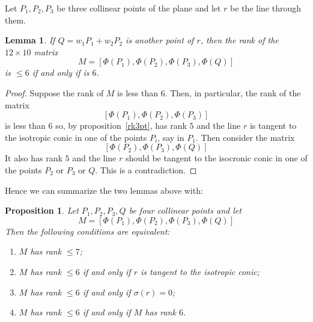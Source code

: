 \documentclass{amsart}
\theoremstyle{plain}
\newtheorem{prop}[theorem]{Proposition}
\newtheorem{lemma}[theorem]{Lemma}
\theoremstyle{definition}
\begin{document}
Let $P_1, P_2, P_3$ be three collinear points of the plane and let $r$
be the line through them. 
\begin{lemma}
  If $Q = w_1P_1+w_2P_2$ is another point of $r$,
  then the rank of the $12\times 10$ matrix
\begin{equation}
M = \left[
\Phi(P_1), \Phi(P_2), \Phi(P_3), \Phi(Q)
\right]
\end{equation}
is $\leq 6$ if and only if is $6$. 
\end{lemma}
\begin{proof}
  Suppose the rank of $M$ is less than $6$. Then, in particular,
  the rank of the matrix
  \[
    [\Phi(P_1), \Phi(P_2), \Phi(P_3)]
  \]
  is less than $6$ so, by proposition~\ref{rk3pt}, has rank $5$ and the
  line $r$ is tangent to the isotropic conic in one of the points
  $P_i$, say in $P_1$. Then consider the matrix
  \[
    [\Phi(P_2), \Phi(P_3), \Phi(Q)]
  \]
  It also has rank $5$ and the line $r$ should be tangent to the isocronic
  conic in one of the points $P_2$ or $P_3$ or $Q$. This is a contradiction.
\end{proof}

Hence we can summarize the two lemmas above with:
\begin{prop}
  Let $P_1, P_2, P_3, Q$ be four collinear points and let
  \[
  M = [\Phi(P_1), \Phi(P_2), \Phi(P_3), \Phi(Q)]
  \]
  Then the following conditions
  are equivalent:
  \begin{enumerate}
  \item $M$ has rank $\leq 7$;
  \item $M$ has rank $\leq 6$ if and only if $r$ is tangent to the
    isotropic conic;
  \item $M$ has rank $\leq 6$ if and only if $\sigma(r) = 0$;
    \item $M$ has rank $\leq 6$ if and only if $M$ has rank $6$. 
  \end{enumerate}
  \label{rango67}
\end{prop}
\end{document}
